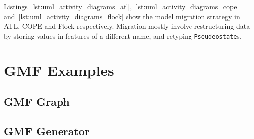 Listings~\ref{lst:uml_activity_diagrams_atl}, \ref{lst:uml_activity_diagrams_cope} and~\ref{lst:uml_activity_diagrams_flock} show the model migration strategy in ATL, COPE and Flock respectively. Migration mostly involve restructuring data by storing values in features of a different name, and retyping \texttt{Pseudeostate}s.




\section{GMF Examples}

\subsection{GMF Graph}




\subsection{GMF Generator}